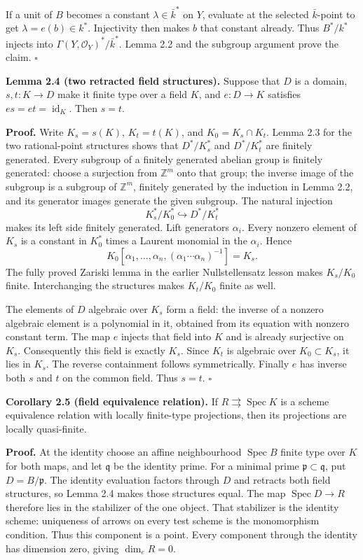 \documentclass[11pt,a4paper,openany]{report}
\begin{document}
If a unit of \(B\) becomes a constant \(\lambda\in\bar k^*\) on \(Y\), evaluate at the selected \(\bar k\)-point to get \(\lambda=e(b)\in k^*\). Injectivity then makes \(b\) that constant already. Thus \(B^*/k^*\) injects into \(\Gamma(Y,\mathcal O_Y)^*/\bar k^*\). Lemma 2.2 and the subgroup argument prove the claim. \(\square\)

\textbf{Lemma 2.4 (two retracted field structures).} Suppose that \(D\) is a domain, \(s,t:K\to D\) make it finite type over a field \(K\), and \(e:D\to K\) satisfies \(es=et=\operatorname{id}_K\). Then \(s=t\).

\textbf{Proof.} Write \(K_s=s(K)\), \(K_t=t(K)\), and \(K_0=K_s\cap K_t\). Lemma 2.3 for the two rational-point structures shows that \(D^*/K_s^*\) and \(D^*/K_t^*\) are finitely generated. Every subgroup of a finitely generated abelian group is finitely generated: choose a surjection from \(\mathbb Z^m\) onto that group; the inverse image of the subgroup is a subgroup of \(\mathbb Z^m\), finitely generated by the induction in Lemma 2.2, and its generator images generate the given subgroup. The natural injection \[
  K_s^*/K_0^*\hookrightarrow D^*/K_t^*
  \] makes its left side finitely generated. Lift generators \(\alpha_i\). Every nonzero element of \(K_s\) is a constant in \(K_0^*\) times a Laurent monomial in the \(\alpha_i\). Hence \[
  K_0[\alpha_1,\ldots,\alpha_n,(\alpha_1\cdots\alpha_n)^{-1}]
  =K_s.
  \] The fully proved Zariski lemma in the earlier Nullstellensatz lesson makes \(K_s/K_0\) finite. Interchanging the structures makes \(K_t/K_0\) finite as well.

The elements of \(D\) algebraic over \(K_s\) form a field: the inverse of a nonzero algebraic element is a polynomial in it, obtained from its equation with nonzero constant term. The map \(e\) injects that field into \(K\) and is already surjective on \(K_s\). Consequently this field is exactly \(K_s\). Since \(K_t\) is algebraic over \(K_0\subset K_s\), it lies in \(K_s\). The reverse containment follows symmetrically. Finally \(e\) has inverse both \(s\) and \(t\) on the common field. Thus \(s=t\). \(\square\)

\textbf{Corollary 2.5 (field equivalence relation).} If \(R\rightrightarrows\operatorname{Spec}K\) is a scheme equivalence relation with locally finite-type projections, then its projections are locally quasi-finite.

\textbf{Proof.} At the identity choose an affine neighbourhood \(\operatorname{Spec}B\) finite type over \(K\) for both maps, and let \(\mathfrak q\) be the identity prime. For a minimal prime \(\mathfrak p\subset\mathfrak q\), put \(D=B/\mathfrak p\). The identity evaluation factors through \(D\) and retracts both field structures, so Lemma 2.4 makes those structures equal. The map \(\operatorname{Spec}D\to R\) therefore lies in the stabilizer of the one object. That stabilizer is the identity scheme: uniqueness of arrows on every test scheme is the monomorphism condition. Thus this component is a point. Every component through the identity has dimension zero, giving \(\dim_{e}\!R=0\).
\end{document}
